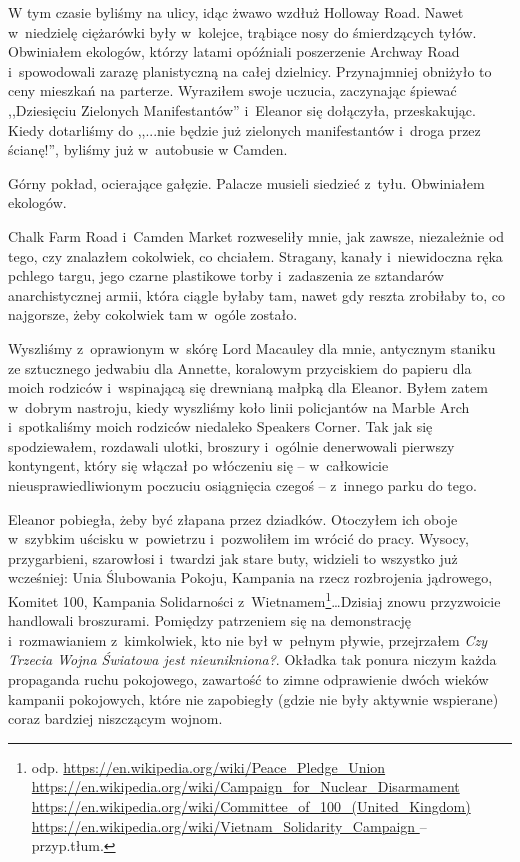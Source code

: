 \documentclass[oneside,polish,11pt,sfheadings]{mwbk}
\begin{document}
W tym czasie byliśmy na ulicy, idąc żwawo wzdłuż Holloway Road. Nawet w~niedzielę ciężarówki były w~kolejce, trąbiące nosy do śmierdzących
tyłów. Obwiniałem ekologów, którzy latami opóźniali poszerzenie Archway
Road i~spowodowali zarazę planistyczną na całej dzielnicy. Przynajmniej
obniżyło to ceny mieszkań na parterze. Wyraziłem swoje uczucia,
zaczynając śpiewać ,,Dziesięciu Zielonych Manifestantów'' i~Eleanor się
dołączyła, przeskakując. Kiedy dotarliśmy do ,,...nie będzie już
zielonych manifestantów i~droga przez ścianę!'', byliśmy już w~autobusie
w Camden.

Górny pokład, ocierające gałęzie. Palacze musieli siedzieć z~tyłu.
Obwiniałem ekologów.

Chalk Farm Road i~Camden Market rozweseliły mnie, jak zawsze,
niezależnie od tego, czy znalazłem cokolwiek, co chciałem. Stragany,
kanały i~niewidoczna ręka pchlego targu, jego czarne plastikowe torby i~zadaszenia ze sztandarów anarchistycznej armii, która ciągle byłaby tam,
nawet gdy reszta zrobiłaby to, co najgorsze, żeby cokolwiek tam w~ogóle zostało.

Wyszliśmy z~oprawionym w~skórę Lord Macauley dla mnie, antycznym staniku
ze sztucznego jedwabiu dla Annette, koralowym przyciskiem do papieru dla
moich rodziców i~wspinającą się drewnianą małpką dla Eleanor. Byłem
zatem w~dobrym nastroju, kiedy wyszliśmy koło linii policjantów na
Marble Arch i~spotkaliśmy moich rodziców niedaleko Speakers Corner. Tak
jak się spodziewałem, rozdawali ulotki, broszury i~ogólnie denerwowali
pierwszy kontyngent, który się włączał po włóczeniu się -- w~całkowicie
nieusprawiedliwionym poczuciu osiągnięcia czegoś -- z~innego parku do
tego.

Eleanor pobiegła, żeby być złapana przez dziadków. Otoczyłem ich oboje w~szybkim uścisku w~powietrzu i~pozwoliłem im wrócić do pracy. Wysocy,
przygarbieni, szarowłosi i~twardzi jak stare buty, widzieli to wszystko
już wcześniej: Unia Ślubowania Pokoju, Kampania na rzecz rozbrojenia
jądrowego, Komitet 100, Kampania Solidarności z~Wietnamem\footnote{ odp.
\url{https://en.wikipedia.org/wiki/Peace_Pledge_Union}
\url{https://en.wikipedia.org/wiki/Campaign_for_Nuclear_Disarmament}
\url{https://en.wikipedia.org/wiki/Committee_of_100_(United_Kingdom)}
\url{https://en.wikipedia.org/wiki/Vietnam_Solidarity_Campaign } -- przyp.tłum.}\ldots Dzisiaj
znowu przyzwoicie handlowali broszurami.  Pomiędzy patrzeniem się na demonstrację i~rozmawianiem z~kimkolwiek, kto nie był w~pełnym pływie, przejrzałem \emph{Czy Trzecia
Wojna Światowa jest nieunikniona?}. Okładka tak ponura niczym każda
propaganda ruchu pokojowego, zawartość to zimne odprawienie dwóch wieków
kampanii pokojowych, które nie zapobiegły (gdzie nie były aktywnie
wspierane) coraz bardziej niszczącym wojnom.
\end{document}
